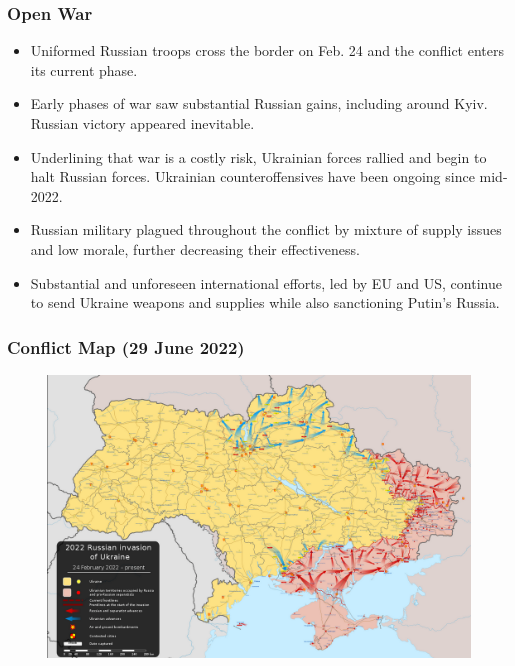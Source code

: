 \documentclass{beamer}
\begin{document}
\begin{frame} 
	\frametitle{\LARGE{Open War}}
	\begin{itemize}
		\item Uniformed Russian troops cross the border on Feb. 24 and the conflict enters its current phase. \pause
		\item Early phases of war saw substantial Russian gains, including around Kyiv. Russian victory appeared inevitable. \pause
		\item Underlining that war is a costly risk, Ukrainian forces rallied and begin to halt Russian forces. Ukrainian counteroffensives have been ongoing since mid-2022. \pause
		\item Russian military plagued throughout the conflict by mixture of supply issues and low morale, further decreasing their effectiveness. \pause
		\item Substantial and unforeseen international efforts, led by EU and US, continue to send Ukraine weapons and supplies while also sanctioning Putin's Russia. 
	\end{itemize}
\end{frame}

\begin{frame} 
	\frametitle{\LARGE{Conflict Map (29 June 2022)}}
	\begin{figure}[ht!]
		\centering
		\includegraphics[width=\textwidth,height=\textheight, keepaspectratio]{29june2022ukraine.png}
	\end{figure}
\end{frame}
\end{document}
